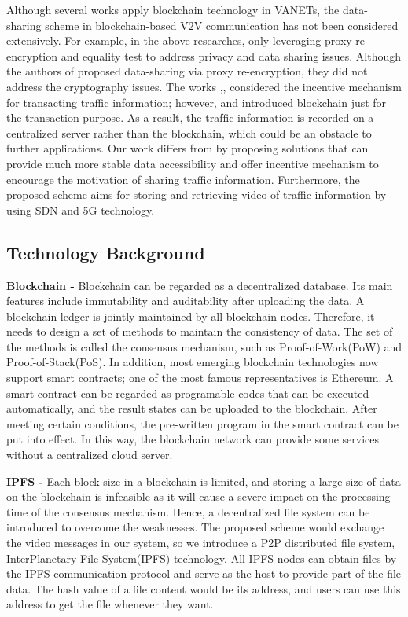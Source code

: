 \documentclass[journal]{IEEEtran}
\begin{document}
    Although several works apply blockchain technology in VANETs, the data-sharing scheme in blockchain-based V2V communication has not been considered extensively. For example, in the above researches, only \cite{BPREET} leveraging proxy re-encryption and equality test to address privacy and data sharing issues. Although the authors of \cite{bsi2018} proposed data-sharing via proxy re-encryption, they did not address the cryptography issues. The works \cite{cap2018},\cite{BPREET},\cite{bsi2018} considered the incentive mechanism for transacting traffic information; however, \cite{cap2018} and \cite{bsi2018} introduced blockchain just for the transaction purpose.  As a result, the trafﬁc information is recorded on a centralized server rather than the blockchain, which could be an obstacle to further applications. Our work differs from \cite{BPREET} by proposing solutions that can provide much more stable data accessibility and offer incentive mechanism to encourage the motivation of sharing traffic information. Furthermore, the proposed scheme aims for storing and retrieving video of traffic information by using SDN and 5G technology.
    
    \subsection{Technology Background}
	\label{technology_background}
    
    \textbf{Blockchain -} Blockchain can be regarded as a decentralized database. Its main features include immutability and auditability after uploading the data. A blockchain ledger is jointly maintained by all blockchain nodes. Therefore, it needs to design a set of methods to maintain the consistency of data. The set of the methods is called the consensus mechanism, such as Proof-of-Work(PoW) and Proof-of-Stack(PoS). In addition, most emerging blockchain technologies now support smart contracts; one of the most famous representatives is Ethereum. A smart contract can be regarded as programable codes that can be executed automatically, and the result states can be uploaded to the blockchain. After meeting certain conditions, the pre-written program in the smart contract can be put into effect. In this way, the blockchain network can provide some services without a centralized cloud server.

    \textbf{IPFS -} Each block size in a blockchain is limited, and storing a large size of data on the blockchain is infeasible as it will cause a severe impact on the processing time of the consensus mechanism. Hence, a decentralized file system can be introduced to overcome the weaknesses. The proposed scheme would exchange the video messages in our system, so we introduce a P2P distributed file system, InterPlanetary File System(IPFS) technology. All IPFS nodes can obtain files by the IPFS communication protocol and serve as the host to provide part of the file data. The hash value of a file content would be its address, and users can use this address to get the file whenever they want.
\end{document}

